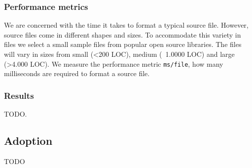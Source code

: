 \subsubsection{Performance metrics}
We are concerned with the time it takes to format a typical source file.
However, source files come in different shapes and sizes.
To accommodate this variety in files we select a small sample files from popular open source libraries.
The files will vary in sizes from small (<200 LOC), medium (~1.0000 LOC) and large (>4.000 LOC).
We measure the performance metric \texttt{ms/file}, how many milliseconds are required to format a source file.

\subsubsection{Results}
TODO.

\subsection{Adoption}\label{sec:adoption}
TODO


